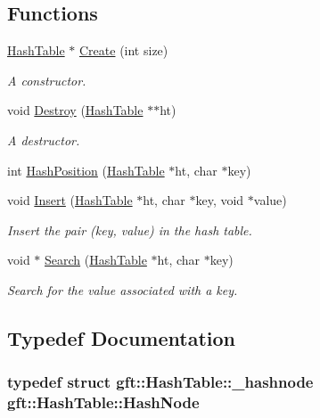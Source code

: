 \subsection*{Functions}
\begin{DoxyCompactItemize}
\item 
\hyperlink{namespacegft_1_1HashTable_a02013deb74406aa4895230360fc84a94}{Hash\-Table} $\ast$ \hyperlink{namespacegft_1_1HashTable_a977f7db61201c9aa4264cab823f3ef52}{Create} (int size)
\begin{DoxyCompactList}\small\item\em A constructor. \end{DoxyCompactList}\item 
void \hyperlink{namespacegft_1_1HashTable_acdf4668e292f30fa93ecae9aedbb6dcb}{Destroy} (\hyperlink{namespacegft_1_1HashTable_a02013deb74406aa4895230360fc84a94}{Hash\-Table} $\ast$$\ast$ht)
\begin{DoxyCompactList}\small\item\em A destructor. \end{DoxyCompactList}\item 
int \hyperlink{namespacegft_1_1HashTable_a5066eb008d3e8dafa7f24150b008b9a4}{Hash\-Position} (\hyperlink{namespacegft_1_1HashTable_a02013deb74406aa4895230360fc84a94}{Hash\-Table} $\ast$ht, char $\ast$key)
\item 
void \hyperlink{namespacegft_1_1HashTable_abe37b84ec8ea18838399cc5374f144d8}{Insert} (\hyperlink{namespacegft_1_1HashTable_a02013deb74406aa4895230360fc84a94}{Hash\-Table} $\ast$ht, char $\ast$key, void $\ast$value)
\begin{DoxyCompactList}\small\item\em Insert the pair (key, value) in the hash table. \end{DoxyCompactList}\item 
void $\ast$ \hyperlink{namespacegft_1_1HashTable_a64f675241fe647270d867c2f51167288}{Search} (\hyperlink{namespacegft_1_1HashTable_a02013deb74406aa4895230360fc84a94}{Hash\-Table} $\ast$ht, char $\ast$key)
\begin{DoxyCompactList}\small\item\em Search for the value associated with a key. \end{DoxyCompactList}\end{DoxyCompactItemize}


\subsection{Typedef Documentation}
\hypertarget{namespacegft_1_1HashTable_a4eada131a57cbf3ab87cfb50823b3613}{
\subsubsection[{Hash\-Node}]{\setlength{\rightskip}{0pt plus 5cm}typedef struct {\bf gft\-::\-Hash\-Table\-::\-\_\-hashnode}  {\bf gft\-::\-Hash\-Table\-::\-Hash\-Node}}}\label{namespacegft_1_1HashTable_a4eada131a57cbf3ab87cfb50823b3613}


